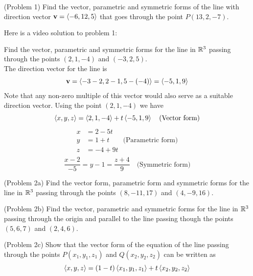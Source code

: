 \documentclass[handout]{ximera}
\begin{document}
\begin{problem}(Problem 1)
Find the vector, parametric and symmetric forms of the line with direction 
vector $\mathbf{v} = \left\langle -6, 12, 5\right\rangle$ that goes through the point $P(13, 2, -7)$. \\
\end{problem}

Here is a video solution to problem 1:\\
\begin{foldable}
\end{foldable}

\begin{example}[Example 2]
Find the vector, parametric and symmetric forms for the line in $\mathbb R^3$ passing 
through the points $(2, 1, -4)$ and $(-3, 2, 5)$.\\
The direction vector for the line is 
\[
\mathbf{v} = \left\langle -3-2, 2-1, 5-(-4)\right\rangle = \left\langle -5, 1, 9\right\rangle
\]
Note that any non-zero multiple of this vector would also serve as a suitable direction vector. 
Using the point $(2, 1, -4)$ we have
\[
\left\langle x, y, z\right\rangle = \left\langle 2, 1, -4\right\rangle + t\left\langle -5, 1, 9\right\rangle \quad \text{(Vector form)}
\]
\begin{align*}
x &= 2 -5t\\
y &= 1 + t \quad\quad\text{(Parametric form)}\\
z &= -4 + 9t\\
\end{align*}
\[
\frac{x-2}{-5} = y-1 = \frac{z+4}{9} \quad \text{(Symmetric form)}
\]
\end{example}

\begin{problem}(Problem 2a)
Find the vector form, parametric form and symmetric forms for the line in $\mathbb R^3$ passing 
through the points $(8, -11, 17)$ and $(4, -9, 16)$.\\
\end{problem}

\begin{problem}(Problem 2b)
Find the vector, parametric and symmetric forms for the line in $\mathbb R^3$ passing through the origin 
and parallel to the line passing though the points $(5, 6, 7)$ and $(2, 4, 6)$.\\
\end{problem}

\begin{problem}(Problem 2c)
Show that the vector form of the equation of the line passing through the 
points $P(x_1, y_1, z_1)$ and $Q(x_2, y_2, z_2)$
can be written as
\[
\left\langle x,y,z\right\rangle = (1-t)\left\langle x_1, y_1, z_1\right\rangle + t\left\langle x_2, y_2, z_2\right\rangle
\]
\end{problem}
\end{document}
